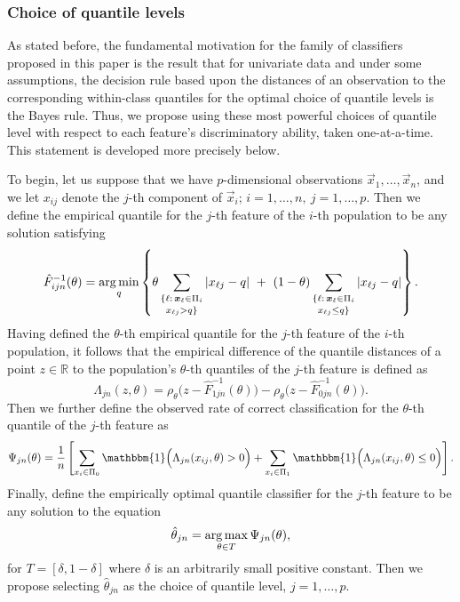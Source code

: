 \subsubsection{Choice of quantile levels}
\label{sec:choice-of-quantile-lev}

As stated before, the fundamental motivation for the family of classifiers
proposed in this paper is the result that for univariate data and under some
assumptions, the decision rule based upon the distances of an observation to the
corresponding within-class quantiles for the optimal choice of quantile levels
is the Bayes rule.  Thus, we propose using these most powerful choices of
quantile level with respect to each feature's discriminatory ability, taken
one-at-a-time.  This statement is developed more precisely below.

To begin, let us suppose that we have $p$-dimensional observations
$\vec{x}_1, \dots, \vec{x}_n$, and we let $x_{ij}$ denote the $j$-th component
of $\vec{x}_i$; $i = 1, \dots, n,~ j = 1, \dots, p$.  Then we define the
empirical quantile for the $j$-th feature of the $i$-th population to be any
solution satisfying
\begin{equation}
  \label{eq:multivariate-empirical-quantile}
  \hat{F}_{ijn}^{-1} (\theta) = \operatorname*{arg\,min}_q \left\{
    \theta \sum_{\substack{ \{ \ell:\, \bm{x}_{\ell} \in \Pi_i  \\[0.5mm] x_{\ell j} > q \} }}
    |x_{\ell j} - q| ~+~
    (1 - \theta)
    \sum_{\substack{ \{ \ell:\, \bm{x}_{\ell} \in \Pi_i  \\[0.5mm] x_{\ell j} \leq q \} }}
    |x_{\ell j} - q|
  \right\}.
\end{equation}
Having defined the $\theta$-th empirical quantile for the $j$-th feature of the
$i$-th population, it follows that the empirical difference of the quantile
distances of a point $z \in \mathbb{R}$ to the population's $\theta$-th
quantiles of the $j$-th feature is defined as
\[
  \Lambda_{jn} (z, \theta) =
  \rho_{\theta}\Big(z - \hat{F}_{1jn}^{-1}(\theta)\Big) -
  \rho_{\theta}\Big(z - \hat{F}_{0jn}^{-1}(\theta)\Big).
\]
Then we further define the observed rate of correct classification for the
$\theta$-th quantile of the $j$-th feature as
\begin{equation}
  \Psi_{jn}(\theta) = \frac{1}{n}
  \left[
    \sum_{x_i \in \Pi_0}
    \mathbbm{1}\Big( \Lambda_{jn}(x_{ij}, \theta) > 0 \Big) +
    \sum_{x_i \in \Pi_1}
    \mathbbm{1}\Big( \Lambda_{jn}(x_{ij}, \theta) \leq 0 \Big)
  \right].
\end{equation}
Finally, define the empirically optimal quantile classifier for the $j$-th
feature to be any solution to the equation
\begin{equation}
  \hat{\theta}_{jn} = \operatorname*{arg\,max}_{\theta \in T} \Psi_{jn}(\theta),
\end{equation}
for $T = [ \delta, 1 - \delta]$ where $\delta$ is an arbitrarily small positive
constant.  Then we propose selecting $\hat{\theta}_{jn}$ as the choice of
quantile level, $j = 1, \dots, p$.




